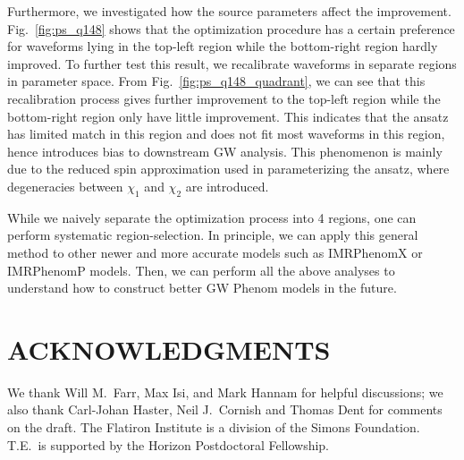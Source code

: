 \documentclass[twocolumn]{aastex631}
\begin{document}
Furthermore, we investigated how the source parameters affect the
improvement. Fig.~\ref{fig:ps_q148} shows that the optimization procedure has a
certain preference for waveforms lying in the top-left region while the bottom-right 
region hardly improved. To further test this result, we recalibrate
waveforms in separate regions in parameter space. From Fig.~\ref{fig:ps_q148_quadrant}, 
we can see that this recalibration process gives further
improvement to the top-left region while the bottom-right region only have little 
improvement. This indicates that the ansatz has limited match in this region and 
does not fit most waveforms in this region, hence introduces bias to downstream GW 
analysis. This phenomenon is mainly due to the reduced spin approximation used in 
parameterizing the ansatz, where degeneracies between $\chi_1$ and $\chi_2$ are introduced. 

While we naively separate the optimization process into 4 regions, one can
perform systematic region-selection. In principle, we can apply this general
method to other newer and more accurate models such as IMRPhenomX or IMRPhenomP
models. Then, we can perform all the above analyses to understand how to
construct better GW Phenom models in the future.  

\section{ACKNOWLEDGMENTS}

We thank Will M.~Farr, Max Isi, and Mark Hannam for helpful discussions; we also
thank Carl-Johan Haster, Neil J.~Cornish and Thomas Dent for comments on the
draft. The Flatiron Institute is a division of the Simons Foundation. T.E.\ is
supported by the Horizon Postdoctoral Fellowship.

\end{document}
